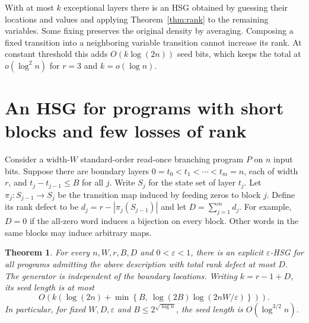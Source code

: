 \documentclass[11pt]{article}
\newtheorem{theorem}{Theorem}
\begin{document}
With at most $k$ exceptional layers there is an HSG obtained by guessing their locations and values and applying Theorem~\ref{thm:rank} to the remaining variables. Some fixing preserves the original density by averaging. Composing a fixed transition into a neighboring variable transition cannot increase its rank. At constant threshold this adds $O(k\log(2n))$ seed bits, which keeps the total at $o(\log^2 n)$ for $r=3$ and $k=o(\log n)$.

\section{An HSG for programs with short blocks and few losses of rank}
\label{sec:block-hsg}

Consider a width-$W$ standard-order read-once branching program $P$ on
$n$ input bits. Suppose there are boundary layers
$0=t_0<t_1<\cdots<t_m=n$, each of width $r$, and
$t_j-t_{j-1}\le B$ for all $j$. Write $S_j$ for the state set of
layer $t_j$. Let $\pi_j:S_{j-1}\to S_j$ be the transition map induced
by feeding zeros to block $j$. Define its rank defect to be
$d_j=r-|\pi_j(S_{j-1})|$ and let $D=\sum_{j=1}^m d_j$.
For example, $D=0$ if the all-zero word induces a bijection on every
block. Other words in the same blocks may induce arbitrary maps.

\begin{theorem}\label{thm:block-hsg}
For every $n,W,r,B,D$ and $0<\varepsilon<1$, there is an explicit
$\varepsilon$-HSG for all programs admitting the above description with
total rank defect at most $D$. The generator is independent of the
boundary locations. Writing $k=r-1+D$, its seed length is at most
\[
 O\!\left(k\left(\log(2n)+
 \min\left\{B,\ \log(2B)\log(2nW/\varepsilon)\right\}\right)\right).
\]
In particular, for fixed $W,D,\varepsilon$ and
$B\le 2^{\sqrt{\log n}}$, the seed length is $O(\log^{3/2}n)$.
\end{theorem}
\end{document}
